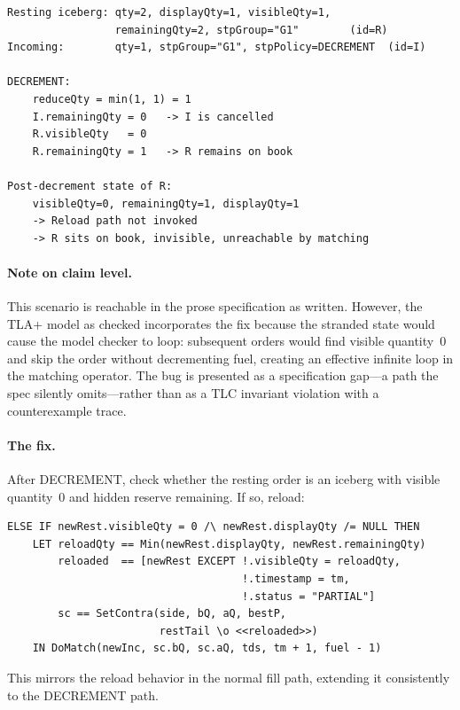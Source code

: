 \documentclass[11pt,a4paper]{article}
\begin{document}
\begin{lstlisting}[language={},basicstyle=\ttfamily\footnotesize,frame=single,xleftmargin=0pt,framexleftmargin=0pt]
Resting iceberg: qty=2, displayQty=1, visibleQty=1,
                 remainingQty=2, stpGroup="G1"        (id=R)
Incoming:        qty=1, stpGroup="G1", stpPolicy=DECREMENT  (id=I)

DECREMENT:
    reduceQty = min(1, 1) = 1
    I.remainingQty = 0   -> I is cancelled
    R.visibleQty   = 0
    R.remainingQty = 1   -> R remains on book

Post-decrement state of R:
    visibleQty=0, remainingQty=1, displayQty=1
    -> Reload path not invoked
    -> R sits on book, invisible, unreachable by matching
\end{lstlisting}

\paragraph{Note on claim level.} This scenario is reachable in the
prose specification as written. However, the TLA+ model as checked
incorporates the fix because the stranded state would cause the model
checker to loop: subsequent orders would find visible quantity~0 and
skip the order without decrementing fuel, creating an effective infinite
loop in the matching operator. The bug is presented as a specification
gap---a path the spec silently omits---rather than as a TLC invariant
violation with a counterexample trace.

\paragraph{The fix.} After DECREMENT, check whether the resting order
is an iceberg with visible quantity~0 and hidden reserve remaining. If
so, reload:

\begin{lstlisting}[language=tlaplus]
ELSE IF newRest.visibleQty = 0 /\ newRest.displayQty /= NULL THEN
    LET reloadQty == Min(newRest.displayQty, newRest.remainingQty)
        reloaded  == [newRest EXCEPT !.visibleQty = reloadQty,
                                     !.timestamp = tm,
                                     !.status = "PARTIAL"]
        sc == SetContra(side, bQ, aQ, bestP,
                        restTail \o <<reloaded>>)
    IN DoMatch(newInc, sc.bQ, sc.aQ, tds, tm + 1, fuel - 1)
\end{lstlisting}

This mirrors the reload behavior in the normal fill path, extending it
consistently to the DECREMENT path.
\end{document}
